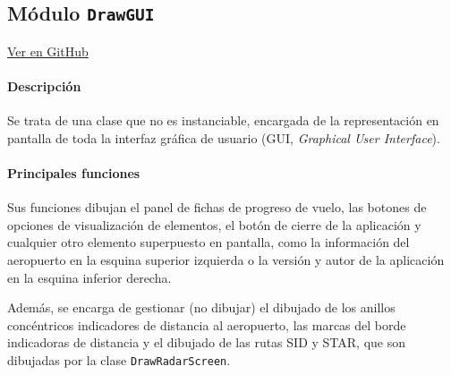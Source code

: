 \subsection{Módulo \texttt{DrawGUI}}
\label{subsec:ClaseDrawGUI}

\vspace{-0.85cm}
\begin{flushright}
\href{https://github.com/macgyver912/atc-simulator/blob/jaime/Assets/Scripts/graphics/DrawGUI.cs}{Ver en GitHub \faGithub}
\end{flushright}

\paragraph{Descripción} \phantom{\newline}

Se trata de una clase que no es instanciable, encargada de la representación en pantalla de toda la interfaz gráfica de usuario (GUI, \textit{Graphical User Interface}).

\paragraph{Principales funciones} \phantom{\newline}

Sus funciones dibujan el panel de fichas de progreso de vuelo, las botones de opciones de visualización de elementos, el botón de cierre de la aplicación y cualquier otro elemento superpuesto en pantalla, como la información del aeropuerto en la esquina superior izquierda o la versión y autor de la aplicación en la esquina inferior derecha.

Además, se encarga de gestionar (no dibujar) el dibujado de los anillos concéntricos indicadores de distancia al aeropuerto, las marcas del borde indicadoras de distancia y el dibujado de las rutas SID y STAR, que son dibujadas por la clase \texttt{DrawRadarScreen}.






